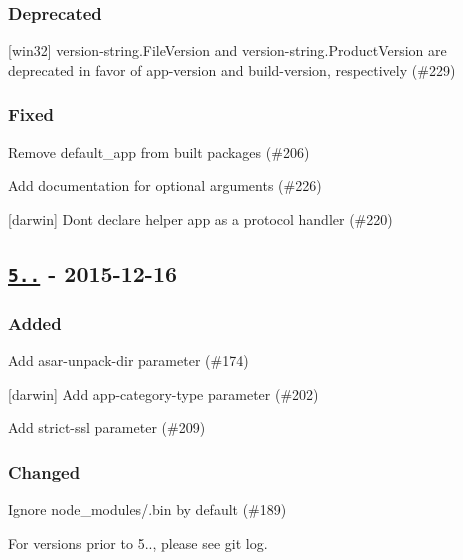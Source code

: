 \subsubsection*{Deprecated}


\begin{DoxyItemize}
\item \mbox{[}win32\mbox{]} {\ttfamily version-\/string.\+File\+Version} and {\ttfamily version-\/string.\+Product\+Version} are deprecated in favor of {\ttfamily app-\/version} and {\ttfamily build-\/version}, respectively (\#229)
\end{DoxyItemize}

\subsubsection*{Fixed}


\begin{DoxyItemize}
\item Remove {\ttfamily default\+\_\+app} from built packages (\#206)
\item Add documentation for optional arguments (\#226)
\item \mbox{[}darwin\mbox{]} Don\textquotesingle{}t declare helper app as a protocol handler (\#220)
\end{DoxyItemize}

\subsection*{\href{https://github.com/electron-userland/electron-packager/compare/v5.1.1...v5.2.0}{\tt 5..} -\/ 2015-\/12-\/16}

\subsubsection*{Added}


\begin{DoxyItemize}
\item Add {\ttfamily asar-\/unpack-\/dir} parameter (\#174)
\item \mbox{[}darwin\mbox{]} Add {\ttfamily app-\/category-\/type} parameter (\#202)
\item Add {\ttfamily strict-\/ssl} parameter (\#209)
\end{DoxyItemize}

\subsubsection*{Changed}


\begin{DoxyItemize}
\item Ignore {\ttfamily node\+\_\+modules/.bin} by default (\#189) 


\end{DoxyItemize}

For versions prior to 5.., please see {\ttfamily git log}. 